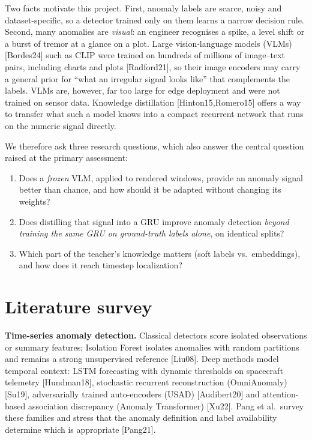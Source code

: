 \documentclass[twoside,english]{article}
\renewcommand{\cite}[1]{[#1]}
\begin{document}
Two facts motivate this project. First, anomaly labels are scarce, noisy and dataset-specific, so a detector trained only on them learns a narrow decision rule. Second, many anomalies are \emph{visual}: an engineer recognises a spike, a level shift or a burst of tremor at a glance on a plot. Large vision-language models (VLMs) \cite{Bordes24} such as CLIP were trained on hundreds of millions of image--text pairs, including charts and plots \cite{Radford21}, so their image encoders may carry a general prior for ``what an irregular signal looks like'' that complements the labels. VLMs are, however, far too large for edge deployment and were not trained on sensor data. Knowledge distillation \cite{Hinton15,Romero15} offers a way to transfer what such a model knows into a compact recurrent network that runs on the numeric signal directly.

We therefore ask three research questions, which also answer the central question raised at the primary assessment:
\begin{enumerate}[leftmargin=*,nosep]
\item[\textbf{RQ1}] Does a \emph{frozen} VLM, applied to rendered windows, provide an anomaly signal better than chance, and how should it be adapted without changing its weights?
\item[\textbf{RQ2}] Does distilling that signal into a GRU improve anomaly detection \emph{beyond training the same GRU on ground-truth labels alone}, on identical splits?
\item[\textbf{RQ3}] Which part of the teacher's knowledge matters (soft labels vs.\ embeddings), and how does it reach timestep localization?
\end{enumerate}

\section{Literature survey} \label{sec:litsurvey}
\textbf{Time-series anomaly detection.} Classical detectors score isolated observations or summary features; Isolation Forest isolates anomalies with random partitions and remains a strong unsupervised reference \cite{Liu08}. Deep methods model temporal context: LSTM forecasting with dynamic thresholds on spacecraft telemetry \cite{Hundman18}, stochastic recurrent reconstruction (OmniAnomaly) \cite{Su19}, adversarially trained auto-encoders (USAD) \cite{Audibert20} and attention-based association discrepancy (Anomaly Transformer) \cite{Xu22}. Pang et al.\ survey these families and stress that the anomaly definition and label availability determine which is appropriate \cite{Pang21}.
\end{document}
